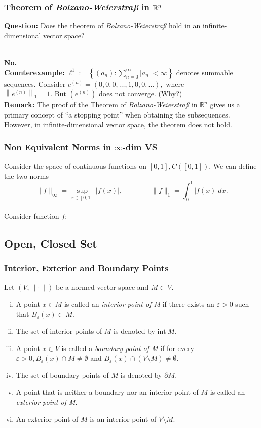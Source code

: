 \documentclass[12pt, t]{beamer}
\renewcommand{\emph}[1]{{\color{Turquoise3}\textsl{#1}}}
\newcommand{\nullspace}{~\\[15pt]}
\begin{document}
\begin{frame}
    \frametitle{Theorem of \textit{Bolzano-Weierstra\ss} in $\mathbb{R}^n$}
    \textbf{Question:} Does the theorem of \textit{Bolzano-Weierstra\ss} hold in an infinite-dimensional vector space?

    \pause
    \nullspace
    \textbf{No.}\\
    \textbf{Counterexample:} $\ell^{1}:=\left\{\left(a_{n}\right): \sum_{n=0}^{\infty}\left|a_{n}\right|<\infty\right\}$ denotes summable sequences.
    Consider $e^{(n)}=(0,0,0, \ldots, 1,0,0, \ldots),$ where $\left\|e^{(n)} \right\|_{1}=1 . \text { But }\left(e^{(n)}\right)$ does not converge. (Why?)
    \nullspace
    \textbf{Remark:} The proof of the Theorem of \textit{Bolzano-Weierstraß} in $\mathbb{R}^n$ gives us a primary concept of ``a stopping point'' when obtaining the subsequences. However, in infinite-dimensional vector space, the theorem does not hold.

\end{frame}

\begin{frame}
    \frametitle{Non Equivalent Norms in $\infty$-dim VS}
    Consider the space of continuous functions on $[0,1],C([0,1])$. We can define the two norms
    \[\|f\|_{\infty}=\sup\limits_{x\in[0,1]}|f(x)|,\qquad\qquad
        \|f\|_1=\int_{0}^{1}|f(x)|dx.\]
    \nullspace
    Consider function $f$:
\end{frame}

\subsection{Open, Closed Set}

\begin{frame}
    \frametitle{Interior, Exterior and Boundary Points}
    Let $(V,\|\cdot\|)$ be a normed vector space and $M\subset V$.
    \begin{enumerate}[(i)]
        \item A point $x\in M$ is called an \emph{interior point of M} if there exists an $\varepsilon>0$ such that $B_{\varepsilon}(x)\subset M$.
        \item The set of interior points of $M$ is denoted by $\text{int}~M$.
        \item A point $x\in V$ is called a \emph{boundary point of M} if for every $\varepsilon>0,B_{\varepsilon}(x)\cap M\neq\emptyset$ and $B_{\varepsilon}(x)\cap(V\setminus M)\neq\emptyset$.
        \item The set of boundary points of $M$ is denoted by $\partial M$.
        \item A point that is neither a boundary nor an interior point of $M$ is called an \emph{exterior point of M}.
        \item An exterior point of $M$ is an interior point of $V\setminus M$.
    \end{enumerate}
\end{frame}
\end{document}
